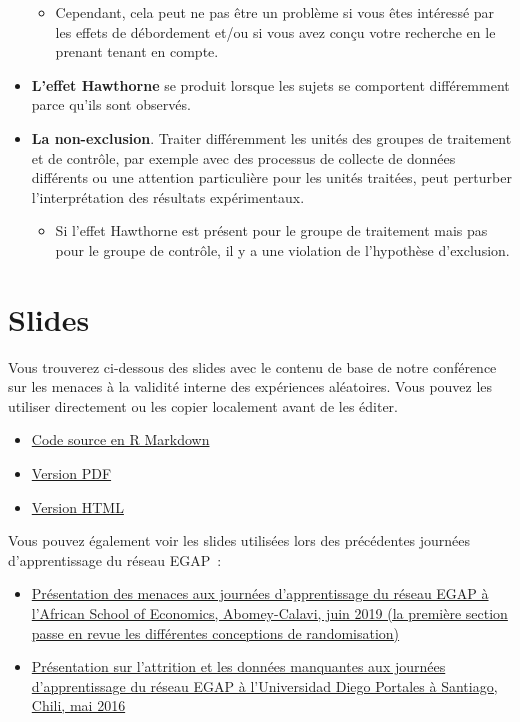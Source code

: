 \documentclass[12pt,]{book}
\providecommand{\tightlist}{%
  \setlength{\itemsep}{0pt}\setlength{\parskip}{0pt}}
\begin{document}
\begin{itemize}
  \begin{itemize}
  \tightlist
  \item
    Cependant, cela peut ne pas être un problème si vous êtes intéressé par les effets de débordement et/ou si vous avez conçu votre recherche en le prenant tenant en compte.
  \end{itemize}
\item
  \textbf{L'effet Hawthorne} se produit lorsque les sujets se comportent différemment parce qu'ils sont observés.
\item
  \textbf{La non-exclusion}. Traiter différemment les unités des groupes de traitement et de contrôle, par exemple avec des processus de collecte de données différents ou une attention particulière pour les unités traitées, peut perturber l'interprétation des résultats expérimentaux.

  \begin{itemize}
  \tightlist
  \item
    Si l'effet Hawthorne est présent pour le groupe de traitement mais pas pour le groupe de contrôle, il y a une violation de l'hypothèse d'exclusion.
  \end{itemize}
\end{itemize}

\hypertarget{slides-7}{%
\section{Slides}\label{slides-7}}

Vous trouverez ci-dessous des slides avec le contenu de base de notre conférence sur les menaces à la validité interne des expériences aléatoires. Vous pouvez les utiliser directement ou les copier localement avant de les éditer.

\begin{itemize}
\item
  \href{https://egap.github.io/learningdays-resources/Slides_fr/threats-slides.Rmd}{Code source en R Markdown}
\item
  \href{https://egap.github.io/learningdays-resources/Slides_fr/threats-slides.pdf}{Version PDF}
\item
  \href{https://egap.github.io/learningdays-resources/Slides_fr/threats-slides.html}{Version HTML}
\end{itemize}

Vous pouvez également voir les slides utilisées lors des précédentes journées d'apprentissage du réseau EGAP~:

\begin{itemize}
\item
  \href{https://egap.github.io/learningdays-resources/Slides/Examples/threats-benin.pdf}{Présentation des menaces aux journées d'apprentissage du réseau EGAP à l'African School of Economics, Abomey-Calavi, juin 2019 (la première section passe en revue les différentes conceptions de randomisation)}
\item
  \href{https://egap.github.io/learningdays-resources/Slides/Examples/threats-santiago.pdf}{Présentation sur l'attrition et les données manquantes aux journées d'apprentissage du réseau EGAP à l'Universidad Diego Portales à Santiago, Chili, mai 2016}
\end{itemize}
\end{document}
